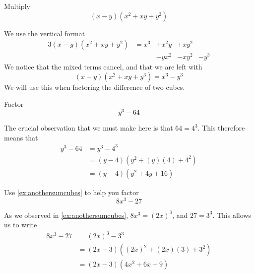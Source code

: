 \begin{myexample}
Multiply
\[
	(x-y)(x^2+xy+y^2)
\]
\end{myexample}
\begin{myProof}
	We use the vertical format
	\begin{alignat*}{3}
		(x-y)(x^2+xy+y^2) & =  x^3 & +x^2y & +x y^2 &      \\
		                  &        & -yx^2 & -xy^2  & -y^3 
	\end{alignat*}
	We notice that the mixed terms cancel, and that we are left with
	\[
		(x-y)(x^2+xy+y^3) = x^3-y^3
	\]
	We will use this when factoring the difference of two cubes.
\end{myProof} 

\begin{myexample}
Factor
\[
	y^3-64
\]
\end{myexample}
\begin{myProof}
	The crucial observation that we must make here is that $64=4^3$. This therefore means
	that
	\begin{align*}
		y^3-64 & =  y^3 - 4^3             \\
		       & =  (y-4)(y^2+(y)(4)+4^2) \\
		       & =  (y-4)(y^2+4y+16)      
	\end{align*}
	{}
\end{myProof} 

\begin{myexample}
Use \cref{ex:anothersumcubes} to help you factor
\[
	8x^3-27
\]
\end{myexample}
\begin{myProof}
	As we observed in \cref{ex:anothersumcubes}, $8x^3 = (2x)^3$, and $27=3^3$. This allows
	us to write
	\begin{align*}
		8x^3-27 & =  (2x)^3 - 3^3                 \\
		        & =  (2x-3)((2x)^2 + (2x)(3)+3^2) \\
		        & =  (2x-3)(4x^2 + 6x + 9)        
	\end{align*} 
\end{myProof} 


